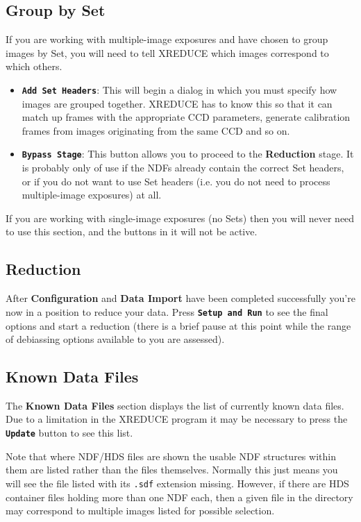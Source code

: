 \documentclass[11pt]{article}
\newcommand{\xlabel}[1]{}
\newcommand{\butt}[1]{{\bf \tt #1}}
\newcommand{\wlab}[1]{{\bf #1}}
\newcommand{\text}[1]{{\tt #1}}
\begin{document}
\subsection{Group by Set \xlabel{CCDMainSets}}
If you are working with multiple-image exposures and have chosen
to group images by Set, you will need to tell XREDUCE which 
images correspond to which others.  
\begin{itemize}
\item \butt{Add Set Headers}:
This will begin a dialog in which you must specify how images are
grouped together.  XREDUCE has to know this so that it can match up
frames with the appropriate CCD parameters, generate calibration
frames from images originating from the same CCD and so on.
\item \butt{Bypass Stage}:
This button allows you to proceed to the \wlab{Reduction} stage.
It is probably only of use if the NDFs already contain the 
correct Set headers, or if you do not want to use Set headers
(i.e. you do not need to process multiple-image exposures) at all.
\end{itemize}

If you are working with single-image exposures (no Sets) then you
will never need to use this section, and the buttons in it will
not be active.

\subsection{Reduction \xlabel{CCDMainReduction}}
After \wlab{Configuration} and \wlab{Data Import} have been completed
successfully you're now in a position to reduce your data. Press
\butt{Setup and Run} to see the final options and start a reduction
(there is a brief pause at this point while the range of debiassing
options available to you are assessed).

\subsection{Known Data Files \xlabel{CCDMainKnownData}}
The \wlab{Known Data Files} section displays the list of currently
known data files. Due to a limitation in the XREDUCE program it may be
necessary to press the \butt{Update} button to see this list.

Note that where NDF/HDS files are shown the usable NDF structures
within them are listed rather than the files themselves.
Normally this just means you will see the file listed 
with its \text{.sdf} extension missing.  However, if there are HDS
container files holding more than one NDF each, then a given
file in the directory may correspond to multiple images listed
for possible selection.
\end{document}
